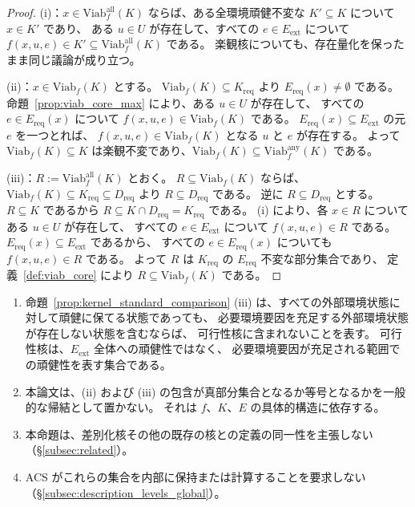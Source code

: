 \begin{proof}
(i)：$x\in\mathrm{Viab}_f^{\mathrm{all}}(K)$ ならば、ある全環境頑健不変な $K'\subseteq K$ について $x\in K'$ であり、
ある $u\in U$ が存在して、すべての $e\in E_{\mathrm{ext}}$ について
$f(x,u,e)\in K'\subseteq\mathrm{Viab}_f^{\mathrm{all}}(K)$ である。
楽観核についても、存在量化を保ったまま同じ議論が成り立つ。

(ii)：$x\in\mathrm{Viab}_f(K)$ とする。
$\mathrm{Viab}_f(K)\subseteq K_{\mathrm{req}}$ より $E_{\mathrm{req}}(x)\neq\emptyset$ である。
命題~\ref{prop:viab_core_max} により、ある $u\in U$ が存在して、
すべての $e\in E_{\mathrm{req}}(x)$ について $f(x,u,e)\in\mathrm{Viab}_f(K)$ である。
$E_{\mathrm{req}}(x)\subseteq E_{\mathrm{ext}}$ の元 $e$ を一つとれば、
$f(x,u,e)\in\mathrm{Viab}_f(K)$ となる $u$ と $e$ が存在する。
よって $\mathrm{Viab}_f(K)\subseteq K$ は楽観不変であり、$\mathrm{Viab}_f(K)\subseteq\mathrm{Viab}_f^{\mathrm{any}}(K)$ である。

(iii)：$R:=\mathrm{Viab}_f^{\mathrm{all}}(K)$ とおく。
$R\subseteq\mathrm{Viab}_f(K)$ ならば、$\mathrm{Viab}_f(K)\subseteq K_{\mathrm{req}}\subseteq D_{\mathrm{req}}$ より $R\subseteq D_{\mathrm{req}}$ である。
逆に $R\subseteq D_{\mathrm{req}}$ とする。
$R\subseteq K$ であるから $R\subseteq K\cap D_{\mathrm{req}}=K_{\mathrm{req}}$ である。
(i) により、各 $x\in R$ についてある $u\in U$ が存在して、
すべての $e\in E_{\mathrm{ext}}$ について $f(x,u,e)\in R$ である。
$E_{\mathrm{req}}(x)\subseteq E_{\mathrm{ext}}$ であるから、
すべての $e\in E_{\mathrm{req}}(x)$ についても $f(x,u,e)\in R$ である。
よって $R$ は $K_{\mathrm{req}}$ の $E_{\mathrm{req}}$ 不変な部分集合であり、
定義~\ref{def:viab_core} により $R\subseteq\mathrm{Viab}_f(K)$ である。
\end{proof}

\begin{remark}[包含関係の読み方と限定]
\label{rem:kernel_standard_comparison_scope}
\begin{enumerate}
  \item 命題~\ref{prop:kernel_standard_comparison} (iii) は、すべての外部環境状態に対して頑健に保てる状態であっても、
  必要環境要因を充足する外部環境状態が存在しない状態を含むならば、
  可行性核に含まれないことを表す。
  可行性核は、$E_{\mathrm{ext}}$ 全体への頑健性ではなく、
  必要環境要因が充足される範囲での頑健性を表す集合である。
  \item 本論文は、(ii) および (iii) の包含が真部分集合となるか等号となるかを一般的な帰結として置かない。
  それは $f$、$K$、$E$ の具体的構造に依存する。
  \item 本命題は、差別化核その他の既存の核との定義の同一性を主張しない
  （\S\ref{subsec:related}）。
  \item ACS がこれらの集合を内部に保持または計算することを要求しない
  （\S\ref{subsec:description_levels_global}）。
\end{enumerate}
\end{remark}

